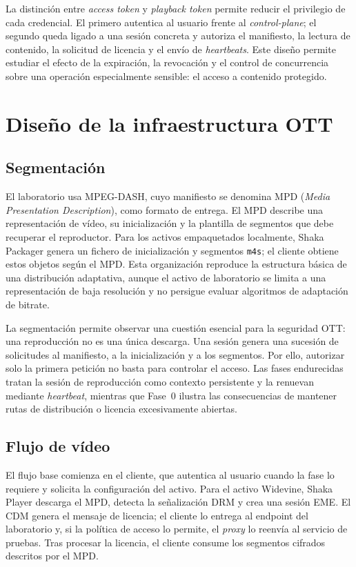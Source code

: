 La distinción entre \textit{access token} y \textit{playback token} permite reducir el privilegio de cada credencial. El primero autentica al usuario frente al \textit{control-plane}; el segundo queda ligado a una sesión concreta y autoriza el manifiesto, la lectura de contenido, la solicitud de licencia y el envío de \textit{heartbeats}. Este diseño permite estudiar el efecto de la expiración, la revocación y el control de concurrencia sobre una operación especialmente sensible: el acceso a contenido protegido.

\section{Diseño de la infraestructura OTT}

\subsection{Segmentación}

El laboratorio usa MPEG-DASH, cuyo manifiesto se denomina MPD (\textit{Media Presentation Description}), como formato de entrega. El MPD describe una representación de vídeo, su inicialización y la plantilla de segmentos que debe recuperar el reproductor. Para los activos empaquetados localmente, Shaka Packager genera un fichero de inicialización y segmentos \nolinkurl{m4s}; el cliente obtiene estos objetos según el MPD. Esta organización reproduce la estructura básica de una distribución adaptativa, aunque el activo de laboratorio se limita a una representación de baja resolución y no persigue evaluar algoritmos de adaptación de bitrate.

La segmentación permite observar una cuestión esencial para la seguridad OTT: una reproducción no es una única descarga. Una sesión genera una sucesión de solicitudes al manifiesto, a la inicialización y a los segmentos. Por ello, autorizar solo la primera petición no basta para controlar el acceso. Las fases endurecidas tratan la sesión de reproducción como contexto persistente y la renuevan mediante \textit{heartbeat}, mientras que Fase~0 ilustra las consecuencias de mantener rutas de distribución o licencia excesivamente abiertas.

\subsection{Flujo de vídeo}

El flujo base comienza en el cliente, que autentica al usuario cuando la fase lo requiere y solicita la configuración del activo. Para el activo Widevine, Shaka Player descarga el MPD, detecta la señalización DRM y crea una sesión EME. El CDM genera el mensaje de licencia; el cliente lo entrega al endpoint del laboratorio y, si la política de acceso lo permite, el \textit{proxy} lo reenvía al servicio de pruebas. Tras procesar la licencia, el cliente consume los segmentos cifrados descritos por el MPD.

